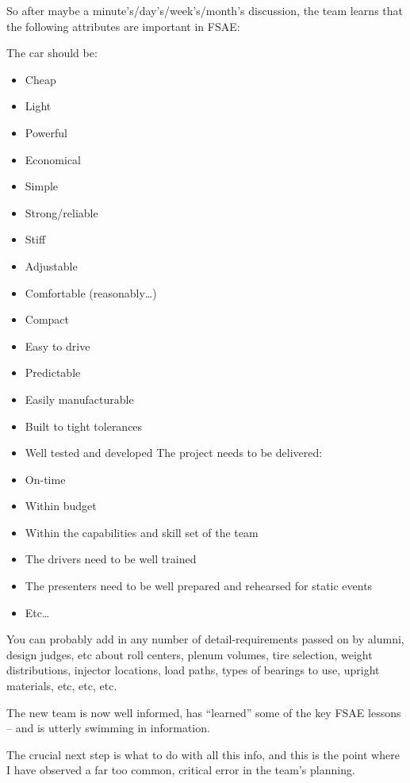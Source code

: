 \documentclass[10pt, a4paper, article, oneside, twocolumn, final]{memoir}
\begin{document}
So after maybe a minute’s/\allowbreak day’s/\allowbreak week’s/\allowbreak month’s discussion, the team learns that the following attributes are important in FSAE: 

The car should be: 

\begin{itemize}
    \item Cheap 
    \item Light 
    \item Powerful 
    \item Economical 
    \item Simple 
    \item Strong/\allowbreak reliable 
    \item Stiff 
    \item Adjustable 
    \item Comfortable (reasonably\ldots) 
    \item Compact 
    \item Easy to drive 
    \item Predictable 
    \item Easily manufacturable 
    \item Built to tight tolerances 
    \item Well tested and developed The project needs to be delivered: 
    \item On-time 
    \item Within budget 
    \item Within the capabilities and skill set of the team
    \item The drivers need to be well trained 
    \item The presenters need to be well prepared and rehearsed for static events 
    \item Etc\ldots
\end{itemize}

You can probably add in any number of detail-requirements passed on by alumni, design judges, etc about roll centers, plenum volumes, tire selection, weight distributions, injector locations, load paths, types of bearings to use, upright materials, etc, etc, etc. 

The new team is now well informed, has “learned” some of the key FSAE lessons -- and is utterly swimming in information. 

The crucial next step is what to do with all this info, and this is the point where I have observed a far too common, critical error in the team’s planning. 
\end{document}
